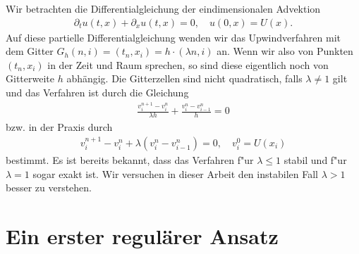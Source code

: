 Wir betrachten die Differentialgleichung der eindimensionalen Advektion
\begin{align}\label{eq:adv:pde}
\partial_t u(t, x) + \partial_x u(t, x) = 0, \quad u(0, x) = U(x).
\end{align}
Auf diese partielle Differentialgleichung wenden wir das Upwindverfahren mit dem Gitter $G_h(n,i) = (t_n, x_i) = h \cdot (\lambda n, i)$ an.
Wenn wir also von Punkten $(t_n, x_i)$ in der Zeit und Raum sprechen, so sind diese eigentlich noch von Gitterweite $h$ abhängig. 
Die Gitterzellen sind nicht quadratisch, falls $\lambda \neq 1$ gilt und das Verfahren ist durch die Gleichung
\begin{align}\label{eq:adv:scheme_rechnung}
\frac {v^{n+1}_i - v^n_i} {\lambda h} + \frac {v^n_i - v^n_{i-1}} h = 0
\end{align}
bzw. in der Praxis durch
\begin{align}\label{eq:adv:scheme}
v^{n+1}_i - v^n_i + \lambda (v^n_i - v^n_{i-1}) = 0, \quad v^0_i = U(x_i)
\end{align}
bestimmt.
Es ist bereits bekannt, dass das Verfahren f"ur $\lambda \leq 1$ stabil und f"ur $\lambda = 1$ sogar exakt ist.
Wir versuchen in dieser Arbeit den instabilen Fall $\lambda > 1$ besser zu verstehen.

\section{Ein erster regulärer Ansatz}\label{sec:regulaer}

